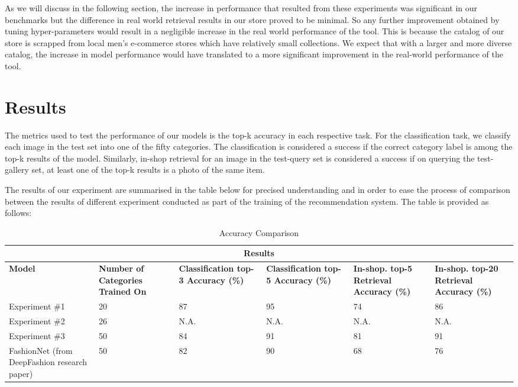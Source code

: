 As we will discuss in the following section, the increase in performance that resulted from these experiments was significant in our benchmarks but the difference in real world retrieval results in our store proved to be minimal. So any further improvement obtained by tuning hyper-parameters would result in a negligible increase in the real world performance of the tool. This is because the catalog of our store is scrapped from local men’s e-commerce stores which have relatively small collections. We expect that with a larger and more diverse catalog, the increase in model performance would have translated to a more significant improvement in the real-world performance of the tool.\\

\section{Results}

The metrics used to test the performance of our models is the top-k accuracy in each respective task. For the classification task, we classify each image in the test set into one of the fifty categories. The classification is considered a success if the correct category label is among the top-k results of the model. Similarly, in-shop retrieval for an image in the test-query set is considered a success if on querying the test-gallery set, at least one of the top-k results is a photo of the same item.\newline

The results of our experiment are summarised in the table below for precised understanding and in order to ease the process of comparison between the results of different experiment conducted as part of the training of the recommendation system. The table is provided as follows:\\

\begin{table}[H]
\begin{tabular}{ @{}|p{2cm}|p{2cm}|p{2.75cm}|p{2.75cm}|p{2cm}|p{2cm}|  }
 \hline
 \multicolumn{6}{|c|}{\textbf{Results}} \\
 \hline
 \textbf{Model} & \textbf{Number of Categories Trained On} & \textbf{Classification top-3 Accuracy (\%)} & \textbf{Classification top-5 Accuracy (\%)}& \textbf{In-shop. top-5 Retrieval Accuracy (\%)}& \textbf{In-shop. top-20 Retrieval Accuracy (\%)}\\
 
  \hline
 Experiment \#1 & 20 & 87 & 95 & 74 & 86 \\ 
 \hline
 Experiment \#2 & 26 & N.A. & N.A. & N.A. & N.A. \\
 \hline
  Experiment \#3 & 50 & 84 & 91 & 81 & 91 \\
 \hline
 FashionNet (from DeepFashion research paper) & 50 & 82 & 90 & 68 & 76 \\
 \hline
\end{tabular}
\caption{Accuracy Comparison}
\label{table:ML experiment comparison}
\end{table}



